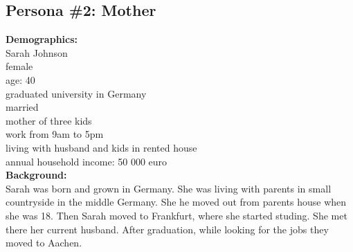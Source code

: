 \documentclass[a4paper,10pt,oneside]{scrreprt}
\begin{document}
		\bigskip

		\subsection{Persona \#2: Mother}

		\begin{mdframed}
			\begin{minipage}{\textwidth}
				\begin{figure}
					\centering
					\vspace{-4cm}
				\end{figure}
				
				\textbf{Demographics:}\\
				Sarah Johnson\\
				female\\
				age: 40\\
				graduated university in Germany\\
				married\\
				mother of three kids\\
				work from 9am to 5pm\\
				living with husband and kids in rented house\\
				annual household income: 50 000 euro\\
				
				\textbf{Background:}\\
				Sarah was born and grown in Germany. She was living with parents in small countryside in the middle Germany. She he moved out from parents house when she was 18. Then Sarah moved to Frankfurt, where she started studing. She met there her current husband. After graduation, while looking for the jobs they moved to Aachen.\\
				

\end{minipage}
\end{mdframed}
\end{document}
